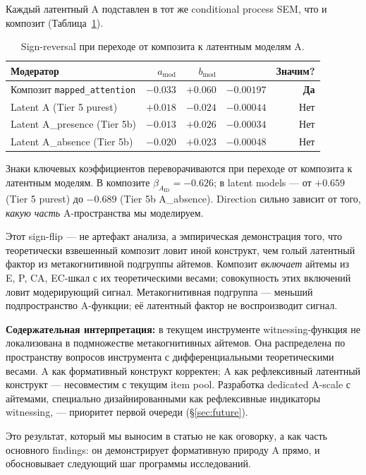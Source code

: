 Каждый латентный A подставлен в тот же conditional process SEM, что и композит (Таблица~\ref{tab:a_signflip}).

\begin{table}[htbp]
\centering
\caption{Sign-reversal при переходе от композита к латентным моделям A.}
\label{tab:a_signflip}
\small
\begin{tabular}{lrrrr}
\toprule
Модератор & $a_{\text{mod}}$ & $b_{\text{mod}}$ & \IMM{} & Значим? \\
\midrule
Композит \texttt{mapped\_attention} & $-0.033$ & $+0.060$ & $\mathbf{-0.00197}$ & \textbf{Да} \\
Latent A (Tier 5 purest) & $+0.018$ & $-0.024$ & $-0.00044$ & Нет \\
Latent A\_presence (Tier 5b) & $-0.013$ & $+0.026$ & $-0.00034$ & Нет \\
Latent A\_absence (Tier 5b) & $-0.020$ & $+0.023$ & $-0.00048$ & Нет \\
\bottomrule
\end{tabular}
\end{table}

Знаки ключевых коэффициентов переворачиваются при переходе от композита к латентным моделям. В композите $\beta_{A_{\text{ID}}} = -0.626$; в latent models --- от $+0.659$ (Tier 5 purest) до $-0.689$ (Tier 5b A\_absence). Direction сильно зависит от того, \emph{какую часть} A-пространства мы моделируем.

Этот sign-flip --- не артефакт анализа, а эмпирическая демонстрация того, что теоретически взвешенный композит ловит иной конструкт, чем голый латентный фактор из метакогнитивной подгруппы айтемов. Композит \emph{включает} айтемы из E, P, CA, EC-шкал с их теоретическими весами; совокупность этих включений ловит модерирующий сигнал. Метакогнитивная подгруппа --- меньший подпространство A-функции; её латентный фактор не воспроизводит сигнал.

\textbf{Содержательная интерпретация:} в текущем инструменте witnessing-функция не локализована в подмножестве метакогнитивных айтемов. Она распределена по пространству вопросов инструмента с дифференциальными теоретическими весами. A как формативный конструкт корректен; A как рефлексивный латентный конструкт --- несовместим с текущим item pool. Разработка dedicated A-scale с айтемами, специально дизайнированными как рефлексивные индикаторы witnessing, --- приоритет первой очереди (§\ref{sec:future}).

Это результат, который мы выносим в статью не как оговорку, а как часть основного findings: он демонстрирует формативную природу A прямо, и обосновывает следующий шаг программы исследований.

